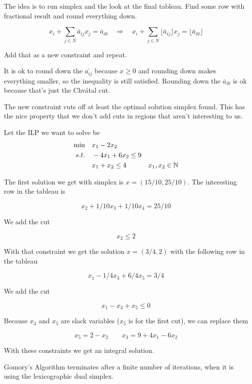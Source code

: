 The idea is to run simplex and the look at the final tableau. Find some row with fractional result and round everything down. 

\[x_i + \sum_{j\in N} \bar a_{ij} x_j = \bar a_{i0} \quad \Rightarrow \quad x_i + \sum_{j\in N} \lfloor\bar a_{ij}\rfloor x_j = \lfloor\bar a_{i0}\rfloor\]

Add that as a new constraint and repeat. 

It is ok to round down the $\bar{a_{ij}}$ because $x\geq 0$ and rounding down makes everything smaller, so the inequality is still satisfied. Rounding down the $\bar a_{i0}$ is ok because that's just the Chv\'{a}tal cut.

The new constraint cuts off at least the optimal solution simplex found. This has the nice property that we don't add cuts in regions that aren't interesting to us.

\begin{Ex} Let the ILP we want to solve be
\begin{align*}
\min \quad& x_1-2x_2\\
s.t. \quad& -4x_1 +6x_2 \leq 9\\
& x_1+x_2 \leq 4
&x_1,x_2 \in \mathbb{N}
\end{align*}

The first solution we get with simplex is $x=(15/10,25/10)$. The interesting row in the tableau is

\[x_2+1/10 x_3 + 1/10x_4 = 25/10\]

We add the cut

\[x_2 \leq 2\]

With that constraint we get the solution $x=(3/4,2)$ with the following row in the tableau

\[x_1-1/4x_3 +6/4 x_5 = 3/4\]

We add the cut

\[x_1-x_3+x_5\leq 0\]

Because $x_3$ and $x_5$ are slack variables ($x_5$ is for the first cut), we can replace them 

\[x_5 = 2-x_2\qquad x_3=9+4x_1-6x_2\]

With these constraints we get an integral solution.
\end{Ex}

\begin{thm} Gomory's Algorithm terminates after a finite number of iterations, when it is using the lexicographic dual simplex.
\end{thm}


